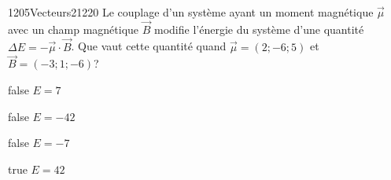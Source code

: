             \begin{question}{1205}{Vecteurs}{2}{1220}
                Le couplage d'un système ayant un moment magnétique $\vec{\mu}$ avec un champ magnétique $\vec{B}$ modifie l'énergie du système d'une quantité $\Delta E=-\vec{\mu}\cdot\vec{B}$. Que vaut cette quantité quand $\vec{\mu}=(2;-6;5)$ et $\vec{B}=(-3;1;-6)$?
            \end{question}
            \begin{reponses}
                \item[false] $E=7$
                \item[false] $E=-42$
                \item[false] $E=-7$
                \item[true] $E=42$
            \end{reponses}
